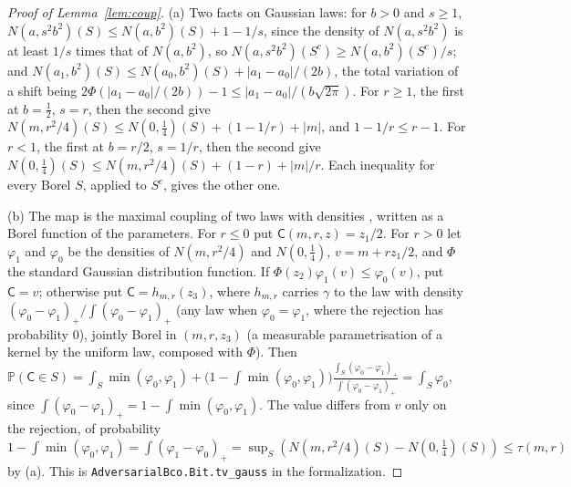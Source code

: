 \documentclass[11pt]{amsart}
\theoremstyle{definition}
\numberwithin{equation}{section}
\newcommand{\Prob}{\mathbb{P}}
\begin{document}
\begin{proof}[Proof of Lemma~\ref{lem:coup}]
(a) Two facts on Gaussian laws: for $b>0$ and $s\ge1$, $N(a,s^2b^2)(S)\le N(a,b^2)(S)+1-1/s$, since the density of $N(a,s^2b^2)$ is at least $1/s$ times that of $N(a,b^2)$, so $N(a,s^2b^2)(S^c)\ge N(a,b^2)(S^c)/s$; and $N(a_1,b^2)(S)\le N(a_0,b^2)(S)+|a_1-a_0|/(2b)$, the total variation of a shift being $2\Phi(|a_1-a_0|/(2b))-1\le|a_1-a_0|/(b\sqrt{2\pi})$. For $r\ge1$, the first at $b=\frac12$, $s=r$, then the second give $N(m,r^2/4)(S)\le N(0,\frac14)(S)+(1-1/r)+|m|$, and $1-1/r\le r-1$. For $r<1$, the first at $b=r/2$, $s=1/r$, then the second give $N(0,\frac14)(S)\le N(m,r^2/4)(S)+(1-r)+|m|/r$. Each inequality for every Borel $S$, applied to $S^c$, gives the other one.

(b) The map is the maximal coupling of two laws with densities \cite[Chapter~1, Theorem~4.4]{Tho00}, written as a Borel function of the parameters. For $r\le0$ put $\mathsf C(m,r,z)=z_1/2$. For $r>0$ let $\varphi_1$ and $\varphi_0$ be the densities of $N(m,r^2/4)$ and $N(0,\frac14)$, $v=m+rz_1/2$, and $\Phi$ the standard Gaussian distribution function. If $\Phi(z_2)\varphi_1(v)\le\varphi_0(v)$, put $\mathsf C=v$; otherwise put $\mathsf C=h_{m,r}(z_3)$, where $h_{m,r}$ carries $\gamma$ to the law with density $(\varphi_0-\varphi_1)_+/\int(\varphi_0-\varphi_1)_+$ (any law when $\varphi_0=\varphi_1$, where the rejection has probability $0$), jointly Borel in $(m,r,z_3)$ (a measurable parametrisation of a kernel by the uniform law, composed with $\Phi$). Then $\Prob(\mathsf C\in S)=\int_S\min(\varphi_0,\varphi_1)+\bigl(1-\int\min(\varphi_0,\varphi_1)\bigr)\frac{\int_S(\varphi_0-\varphi_1)_+}{\int(\varphi_0-\varphi_1)_+}=\int_S\varphi_0$, since $\int(\varphi_0-\varphi_1)_+=1-\int\min(\varphi_0,\varphi_1)$. The value differs from $v$ only on the rejection, of probability $1-\int\min(\varphi_0,\varphi_1)=\int(\varphi_1-\varphi_0)_+=\sup_S(N(m,r^2/4)(S)-N(0,\frac14)(S))\le\tau(m,r)$ by (a).
This is \texttt{AdversarialBco.Bit.tv\_gauss} in the formalization.
\end{proof}
\end{document}
